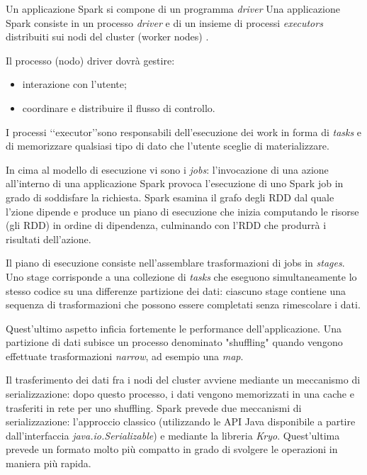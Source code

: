 Un applicazione Spark si compone di un programma \textit{driver}
Una applicazione Spark consiste in un processo \textit{driver} e di un insieme di processi \textit{executors} distribuiti sui nodi del cluster (worker nodes) .

Il processo (nodo)   driver dovrà gestire:
\begin{itemize}
\item interazione con l'utente;
\item coordinare e distribuire il flusso di controllo.
\end{itemize}


 
I processi \lq\lq executor\rq\rq sono responsabili dell'esecuzione dei work in forma di \textit{tasks} e di memorizzare qualsiasi tipo di dato che l'utente sceglie di materializzare. 

In cima al modello di esecuzione vi sono i \textit{jobs}: l'invocazione di una azione all'interno di una applicazione Spark provoca l'esecuzione di uno Spark job in grado di soddisfare la richiesta. Spark esamina il grafo degli RDD dal quale l'zione dipende e produce un piano di esecuzione che inizia computando le risorse (gli RDD) in ordine di dipendenza, culminando con l'RDD che produrrà i risultati dell'azione.
 

Il piano di esecuzione consiste nell'assemblare trasformazioni di jobs in \textit{stages}. Uno stage corrisponde a una collezione di \textit{tasks} che eseguono simultaneamente lo stesso codice su una differenze partizione dei dati: ciascuno stage contiene una sequenza di trasformazioni che possono essere completati senza rimescolare i dati.

Quest'ultimo aspetto inficia fortemente le performance dell'applicazione. Una partizione di dati subisce un processo denominato "shuffling"  quando vengono effettuate trasformazioni \textit{narrow}, ad esempio una \textit{map}.

Il trasferimento dei dati fra i nodi del cluster avviene mediante un meccanismo di serializzazione: dopo questo processo, i dati vengono memorizzati in una cache e trasferiti in rete per uno shuffling. Spark prevede due meccanismi di serializzazione: l'approccio classico (utilizzando le API Java disponibile a partire dall'interfaccia \textit{java.io.Serializable}) e mediante la libreria \textit{Kryo}. Quest'ultima prevede un formato molto più compatto in grado di svolgere le operazioni in maniera più rapida.


